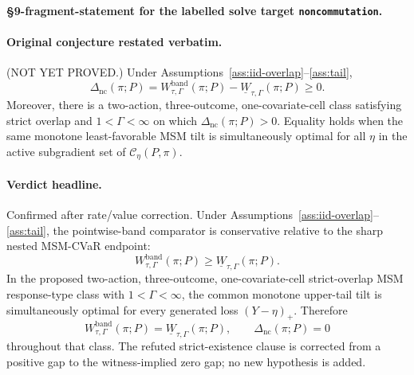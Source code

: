 
\paragraph{\S9-fragment-statement for the labelled solve target \texttt{noncommutation}.}
\paragraph{Original conjecture restated verbatim.}\label{conj:noncommutation}
(NOT YET PROVED.)  Under Assumptions~\ref{ass:iid-overlap}--\ref{ass:tail},
\[
\Delta_{\mathrm{nc}}(\pi;P)=
W_{\tau,\Gamma}^{\mathrm{band}}(\pi;P)
-\underline W_{\tau,\Gamma}(\pi;P)\geq 0.
\]
Moreover, there is a two-action, three-outcome, one-covariate-cell class satisfying strict overlap
and \(1<\Gamma<\infty\) on which \(\Delta_{\mathrm{nc}}(\pi;P)>0\).  Equality holds when the same
monotone least-favorable MSM tilt is simultaneously optimal for all \(\eta\) in the active
subgradient set of \(\mathcal C_\eta(P,\pi)\).

\begin{theorem}\label{thm:noncommutation-zero-finite-class}
\paragraph{Verdict headline.}
Confirmed after rate/value correction.  Under Assumptions~\ref{ass:iid-overlap}--\ref{ass:tail},
the pointwise-band comparator is conservative relative to the sharp nested MSM-CVaR endpoint:
\[
W_{\tau,\Gamma}^{\mathrm{band}}(\pi;P)
\ge
\underline W_{\tau,\Gamma}(\pi;P).
\]
In the proposed two-action, three-outcome, one-covariate-cell strict-overlap MSM response-type
class with \(1<\Gamma<\infty\), the common monotone upper-tail tilt is simultaneously optimal for
every generated loss \((Y-\eta)_+\).  Therefore
\[
W_{\tau,\Gamma}^{\mathrm{band}}(\pi;P)
=
\underline W_{\tau,\Gamma}(\pi;P),
\qquad
\Delta_{\mathrm{nc}}(\pi;P)=0
\]
throughout that class.  The refuted strict-existence clause is corrected from a positive gap to the
witness-implied zero gap; no new hypothesis is added.
\end{theorem}

